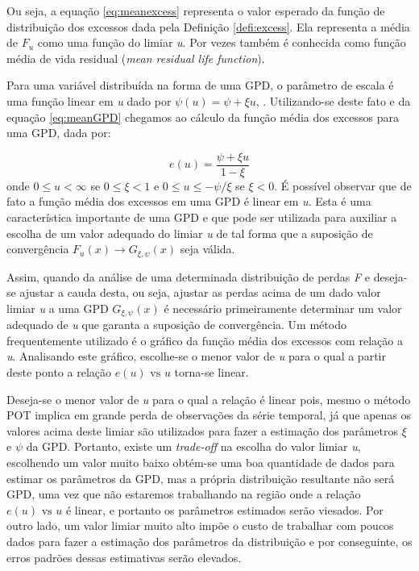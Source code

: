 \documentclass[1p]{elsarticle}
\theoremstyle{definition}
\begin{document}
Ou seja, a equação \eqref{eq:meanexcess} representa o valor esperado da função de distribuição dos excessos dada pela Definição \ref{defi:excess}. Ela representa a média de $F_u$ como uma função do limiar \emph{u}. Por vezes também é conhecida como função média de vida residual (\emph{mean residual life function}).

Para uma variável distribuída na forma de uma GPD, o parâmetro de escala é uma função linear em \emph{u} dado por $\psi(u)=\psi + \xi u$, \cite[Teorema 3.4.13(e)]{Embrechts1997}. Utilizando-se deste fato e da equação \eqref{eq:meanGPD} chegamos ao cálculo da função média dos excessos para uma GPD, dada por:

\begin{equation}
\label{eq:eu}
e(u)=\frac{\psi+\xi u}{1-\xi}
\end{equation}
onde $0 \leq u < \infty$ se $0 \leq \xi <1$ e $0 \leq u \leq -\psi / \xi$ se $\xi < 0$. É possível observar que de fato a função média dos excessos em uma GPD é linear em \emph{u}. Esta é uma característica importante de uma GPD e que pode ser utilizada para auxiliar a escolha de um valor adequado do limiar \emph{u} de tal forma que a suposição de convergência $F_u(x) \rightarrow G_{\xi, \psi}(x)$ seja válida.

Assim, quando da análise de uma determinada distribuição de perdas \emph{F} e deseja-se ajustar a cauda desta, ou seja, ajustar as perdas acima de um dado valor limiar \emph{u} a uma GPD $G_{\xi, \psi}(x)$ é necessário primeiramente determinar um valor adequado de \emph{u} que garanta a suposição de convergência. Um método frequentemente utilizado é o gráfico da função média dos excessos com relação a \emph{u}. Analisando este gráfico, escolhe-se o menor valor de \emph{u} para o qual a partir deste ponto a relação $e(u) \text{ vs } u$ torna-se linear.

Deseja-se o menor valor de \emph{u} para o qual a relação é linear pois, mesmo o método POT implica em grande perda de observações da série temporal, já que apenas os valores acima deste limiar são utilizados para fazer a estimação dos parâmetros $\xi$ e $\psi$ da GPD. Portanto, existe um \emph{trade-off} na escolha do valor limiar \emph{u}, escolhendo um valor muito baixo obtém-se uma boa quantidade de dados para estimar os parâmetros da GPD, mas a própria distribuição resultante não será GPD, uma vez que não estaremos trabalhando na região onde a relação $e(u) \text{ vs } u$ é linear, e portanto os parâmetros estimados serão viesados. Por outro lado, um valor limiar muito alto impõe o custo de trabalhar com poucos dados para fazer a estimação dos parâmetros da distribuição e por conseguinte, os erros padrões dessas estimativas serão elevados.
\end{document}
